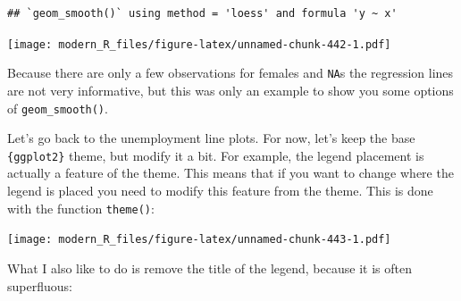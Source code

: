 \documentclass[]{gitbook}
\newenvironment{Shaded}{\begin{snugshade}}{\end{snugshade}}
\newcommand{\DataTypeTok}[1]{\textcolor[rgb]{0.13,0.29,0.53}{#1}}
\newcommand{\KeywordTok}[1]{\textcolor[rgb]{0.13,0.29,0.53}{\textbf{#1}}}
\newcommand{\NormalTok}[1]{#1}
\newcommand{\OperatorTok}[1]{\textcolor[rgb]{0.81,0.36,0.00}{\textbf{#1}}}
\newcommand{\StringTok}[1]{\textcolor[rgb]{0.31,0.60,0.02}{#1}}
\begin{document}
\begin{verbatim}
## `geom_smooth()` using method = 'loess' and formula 'y ~ x'
\end{verbatim}

\texttt{[image: modern\_R\_files/figure-latex/unnamed-chunk-442-1.pdf]}

Because there are only a few observations for females and \texttt{NA}s the regression lines are not very informative,
but this was only an example to show you some options of \texttt{geom\_smooth()}.

Let's go back to the unemployment line plots. For now, let's keep the base \texttt{\{ggplot2\}} theme, but
modify it a bit. For example, the legend placement is actually a feature of the theme. This means
that if you want to change where the legend is placed you need to modify this feature from the
theme. This is done with the function \texttt{theme()}:

\begin{Shaded}
\end{Shaded}

\texttt{[image: modern\_R\_files/figure-latex/unnamed-chunk-443-1.pdf]}

What I also like to do is remove the title of the legend, because it is often superfluous:
\end{document}
